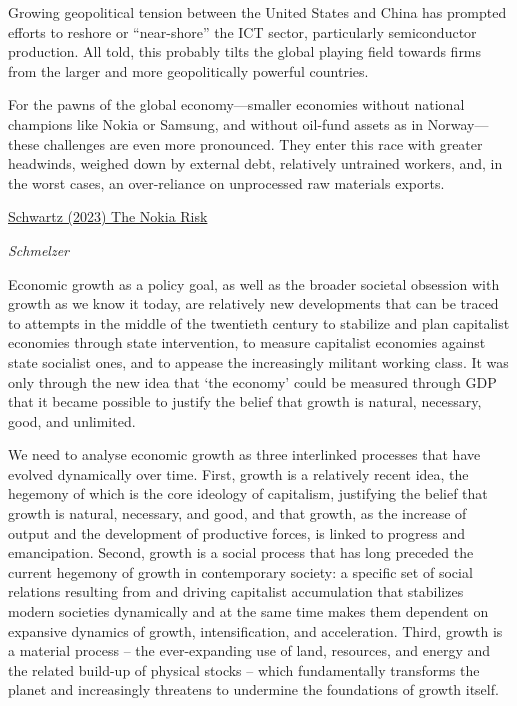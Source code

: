 \documentclass[
]{book}
\begin{document}
Growing geopolitical tension between the United States and China has prompted efforts to reshore or ``near-shore'' the ICT sector, particularly semiconductor production. All told, this probably tilts the global playing field towards firms from the larger and more geopolitically powerful countries.

For the pawns of the global economy---smaller economies without national champions like Nokia or Samsung, and without oil-fund assets as in Norway---these challenges are even more pronounced. They enter this race with greater headwinds, weighed down by external debt, relatively untrained workers, and, in the worst cases, an over-reliance on unprocessed raw materials exports.

\href{https://www.phenomenalworld.org/analysis/nokia-risk/}{Schwartz (2023) The Nokia Risk}

\emph{Schmelzer}

Economic growth as a
policy goal, as well as the broader societal obsession with growth as we
know it today, are relatively new developments that can be traced to
attempts in the middle of the twentieth century to stabilize and plan
capitalist economies through state intervention, to measure capitalist
economies against state socialist ones, and to appease the increasingly
militant working class. It was only through the new idea that `the economy'
could be measured through GDP that it became possible to justify the belief
that growth is natural, necessary, good, and unlimited.

We need to analyse
economic growth as three interlinked processes that have evolved
dynamically over time. First, growth is a relatively recent idea, the
hegemony of which is the core ideology of capitalism, justifying the belief
that growth is natural, necessary, and good, and that growth, as the increase
of output and the development of productive forces, is linked to progress
and emancipation. Second, growth is a social process that has long
preceded the current hegemony of growth in contemporary society: a
specific set of social relations resulting from and driving capitalist
accumulation that stabilizes modern societies dynamically and at the same
time makes them dependent on expansive dynamics of growth,
intensification, and acceleration. Third, growth is a material process -- the
ever-expanding use of land, resources, and energy and the related build-up
of physical stocks -- which fundamentally transforms the planet and
increasingly threatens to undermine the foundations of growth itself.
\end{document}
